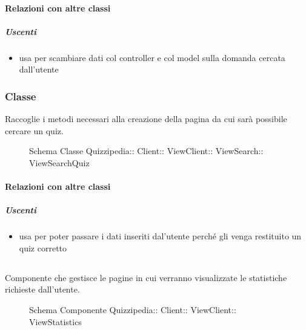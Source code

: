 \paragraph{Relazioni con altre classi}
\subparagraph{Uscenti}
\begin{itemize}
\item usa  per scambiare dati col controller e col model sulla domanda cercata dall'utente
\end{itemize}
\subsubsection{Classe }
Raccoglie i metodi necessari alla creazione della pagina da cui sarà possibile cercare un quiz.
\begin{figure}[H]
\centering
\noindent{}
\caption[Schema Classe ViewSearchQuiz]{Schema Classe Quizzipedia:: Client:: ViewClient:: ViewSearch:: ViewSearchQuiz}
\end{figure}
\paragraph{Relazioni con altre classi}
\subparagraph{Uscenti}
\begin{itemize}
\item usa  per poter passare i dati inseriti dal'utente perché gli venga restituito un quiz corretto
\end{itemize}
\subsection{}
Componente che gestisce le pagine in cui verranno visualizzate le statistiche richieste dall'utente.
\begin{figure}[H]
\centering
\noindent{}
\caption[Schema Componente ViewStatistics]{Schema Componente Quizzipedia:: Client:: ViewClient:: ViewStatistics}
\end{figure}
